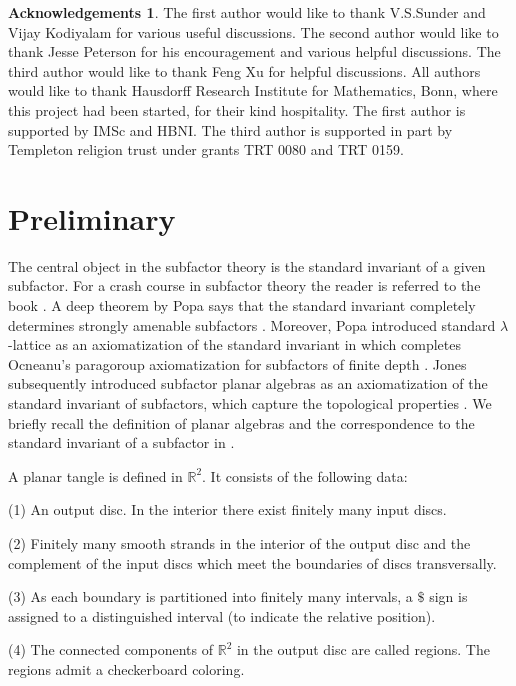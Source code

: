 \documentclass[11pt,letterpaper]{amsart}
\theoremstyle{definition}
\newtheorem*{acknowledgement}{Acknowledgements}
\theoremstyle{remark}
\begin{document}
\begin{acknowledgement}
The first author would like to thank V.S.Sunder and Vijay Kodiyalam for various useful discussions.
The second author would like to thank Jesse Peterson for his encouragement and various helpful discussions.
The third author would like to thank Feng Xu for helpful discussions. 
All authors would like to thank Hausdorff Research Institute for Mathematics, Bonn, where this project had been started, for their kind hospitality.
The first author is supported by IMSc and HBNI.
The third author is supported in part by Templeton religion trust under grants TRT 0080 and TRT 0159.
\end{acknowledgement}


\section{Preliminary}\label{Sec:preliminary}
The central object in the subfactor theory is the standard invariant of a given subfactor. For a crash course in subfactor theory the reader is referred to the book \cite{JS}. A deep theorem by Popa says that the standard invariant completely determines strongly amenable subfactors \cite{Po2}. Moreover, Popa introduced standard $\lambda$-lattice as an axiomatization of the standard invariant in \cite{Po3} which completes Ocneanu's paragoroup axiomatization for subfactors of finite depth \cite{Ocn88}. Jones  subsequently introduced subfactor planar algebras as an axiomatization of the standard invariant of subfactors, which capture the topological properties \cite{Jo2}. We briefly recall the definition of planar algebras and the correspondence to the standard invariant of a subfactor in \cite{Jo2}.

A planar tangle is defined in $\mathbb{R}^2$. It consists of the following data:

(1) An output disc. In the interior there exist finitely many input discs. 

(2) Finitely many smooth strands in the interior of the output disc and the complement of the input discs which meet the boundaries of discs transversally. 

(3) As each boundary is partitioned into finitely many intervals, a $\$$ sign  is assigned to a distinguished interval (to indicate the relative position). 

(4) The connected components of $\mathbb{R}^2$ in the output disc are called regions. The regions admit a checkerboard coloring.
\end{document}
